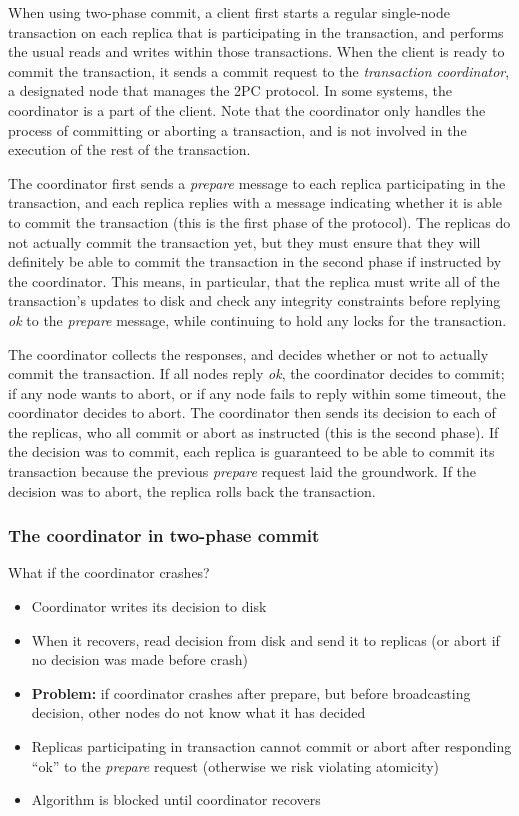 When using two-phase commit, a client first starts a regular single-node transaction on each replica that is participating in the transaction, and performs the usual reads and writes within those transactions.
When the client is ready to commit the transaction, it sends a commit request to the \emph{transaction coordinator}, a designated node that manages the 2PC protocol.
In some systems, the coordinator is a part of the client.
Note that the coordinator only handles the process of committing or aborting a transaction, and is not involved in the execution of the rest of the transaction.

The coordinator first sends a \emph{prepare} message to each replica participating in the transaction, and each replica replies with a message indicating whether it is able to commit the transaction (this is the first phase of the protocol).
The replicas do not actually commit the transaction yet, but they must ensure that they will definitely be able to commit the transaction in the second phase if instructed by the coordinator.
This means, in particular, that the replica must write all of the transaction's updates to disk and check any integrity constraints before replying \emph{ok} to the \emph{prepare} message, while continuing to hold any locks for the transaction.

The coordinator collects the responses, and decides whether or not to actually commit the transaction.
If all nodes reply \emph{ok}, the coordinator decides to commit; if any node wants to abort, or if any node fails to reply within some timeout, the coordinator decides to abort.
The coordinator then sends its decision to each of the replicas, who all commit or abort as instructed (this is the second phase).
If the decision was to commit, each replica is guaranteed to be able to commit its transaction because the previous \emph{prepare} request laid the groundwork.
If the decision was to abort, the replica rolls back the transaction.

\begin{frame}
    \label{s:2pc-coordinator}
    \frametitle{The coordinator in two-phase commit}
    What if the coordinator crashes?\pause
    \begin{itemize}
        \item Coordinator writes its decision to disk
        \item When it recovers, read decision from disk and send it to replicas
            (or abort if no decision was made before crash)\pause
        \item \textbf{Problem:} if coordinator crashes after prepare, but before broadcasting decision, other nodes do not know what it has decided\pause
        \item Replicas participating in transaction cannot commit or abort after responding ``ok'' to the \emph{prepare} request (otherwise we risk violating atomicity)\pause
        \item Algorithm is blocked until coordinator recovers
    \end{itemize}
\end{frame}
\label{l:2pc-coordinator}

